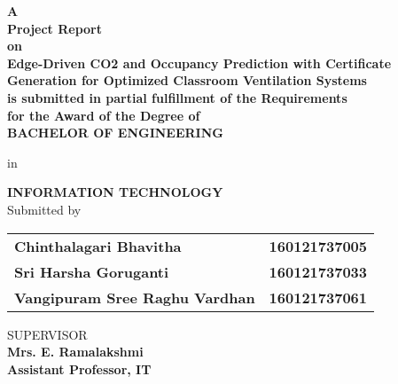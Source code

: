 \begin{titlepage}
\begin{center}
\vspace{2cm} 


\normalsize \textbf{A \\[0.075in] Project Report\\ [0.075in]on}  \\
[0.075in]

\Large{\textbf{Edge-Driven CO2 and Occupancy Prediction with Certificate Generation for Optimized Classroom Ventilation Systems}}
\\%
\vspace{1.5em}%
\normalsize\textbf{is submitted in partial fulfillment of the Requirements\\ [0.075in]
for the Award of the Degree of} \\ [0.075in]
\vspace{1.5em}
\uppercase{\bf{\textsc{BACHELOR OF ENGINEERING}}} \\
\vspace{0.5em}

in \\
\vspace{0.5em}

\textbf{INFORMATION TECHNOLOGY} \\
\vspace{0.5em}
 Submitted by\\

	\begin{table}[h!]
		\centering
		\begin{tabular}{l l}
			\textbf{Chinthalagari Bhavitha} & \textbf{160121737005}\\ [0.075in]
			
   \textbf{Sri Harsha Goruganti} & \textbf{160121737033}\\ [0.075in]
   \textbf{Vangipuram Sree Raghu Vardhan} & \textbf{160121737061} \\ [0.075in]
			
		\end{tabular} 
	\end{table}

SUPERVISOR\\ [0.075in]
\textbf{Mrs. E. Ramalakshmi }\\ [0.075in]
\textbf{Assistant Professor, IT}\\ [0.075in]




\end{center}
\end{titlepage}
